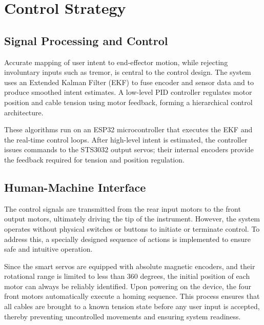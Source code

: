 
\section{Control Strategy} %


\subsection{Signal Processing and Control}
Accurate mapping of user intent to end-effector motion, while rejecting involuntary inputs such as tremor, is central to the control design. The system uses an Extended Kalman Filter (EKF) to fuse encoder and sensor data and to produce smoothed intent estimates. A low-level PID controller regulates motor position and cable tension using motor feedback, forming a hierarchical control architecture.

These algorithms run on an ESP32 microcontroller that executes the EKF and the real-time control loops. After high-level intent is estimated, the controller issues commands to the STS3032 output servos; their internal encoders provide the feedback required for tension and position regulation.

\subsection{Human-Machine Interface}

The control signals are transmitted from the rear input motors to the front output motors, ultimately driving the tip of the instrument. However, the system operates without physical switches or buttons to initiate or terminate control. To address this, a specially designed sequence of actions is implemented to ensure safe and intuitive operation.

Since the smart servos are equipped with absolute magnetic encoders, and their rotational range is limited to less than 360 degrees, the initial position of each motor can always be reliably identified. Upon powering on the device, the four front motors automatically execute a homing sequence. This process ensures that all cables are brought to a known tension state before any user input is accepted, thereby preventing uncontrolled movements and ensuring system readiness.

